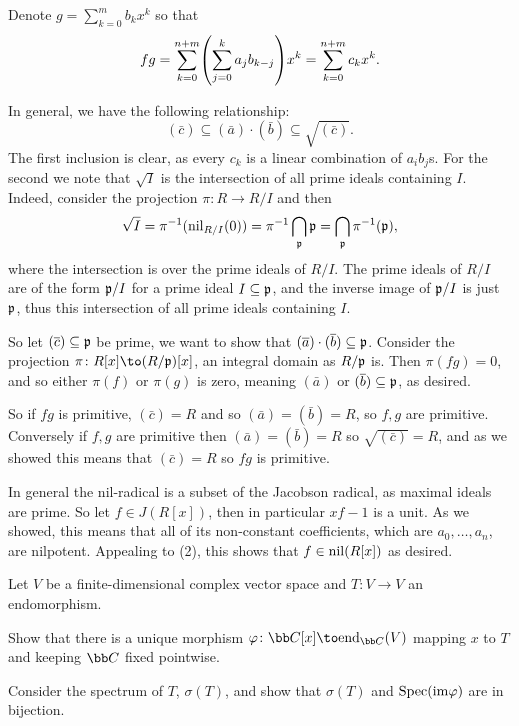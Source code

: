     \item Denote $g=\sum_{k=0}^mb_kx^k$ so that
    $$ fg = \sum_{k=0}^{n+m}\mathopen{}\mathclose{\left(\sum_{j=0}^k a_jb_{k-j}\right)}x^k = \sum_{k=0}^{n+m} c_kx^k . $$

    In general, we have the following relationship:
    $$ (\bar c) \subseteq (\bar a)\cdot(\bar b) \subseteq \sqrt{(\bar c)} . $$
    The first inclusion is clear, as every $c_k$ is a linear combination of $a_ib_j$s.
    For the second we note that $\sqrt I$ is the intersection of all prime ideals containing $I$.
    Indeed, consider the projection $\pi\colon R\to R/I$ and then
    $$ \sqrt I = \pi^{-1}({\rm nil}_{R/I}(0)) = \pi^{-1}\bigcap_{{\frak p}}{{\frak p}} = \bigcap_{{\frak p}}\pi^{-1}({{\frak p}}) , $$
    where the intersection is over the prime ideals of $R/I$.
    The prime ideals of $R/I$ are of the form ${{\frak p}}/I$ for a prime ideal $I\subseteq{{\frak p}}$, and the inverse image of
    ${{\frak p}}/I$ is just ${{\frak p}}$, thus this intersection of all prime ideals containing $I$.

    So let $({\overline{c}})\subseteq{{\frak p}}$ be prime, we want to show that $({\overline{a}})\cdot({\overline{b}})\subseteq{{\frak p}}$.
    Consider the projection $\pi\colon R[x]\to(R/\p)[x]$, an integral domain as $R/{{\frak p}}$ is.
    Then $\pi(fg)=0$, and so either $\pi(f)$ or $\pi(g)$ is zero, meaning $(\bar a)$ or $({\overline{b}})\subseteq{{\frak p}}$, as desired.

    So if $fg$ is primitive, $(\bar c)=R$ and so $(\bar a)=(\bar b)=R$, so $f,g$ are primitive.
    Conversely if $f,g$ are primitive then $(\bar a)=(\bar b)=R$ so $\sqrt{(\bar c)}=R$, and as we showed this means that
    $(\bar c)=R$ so $fg$ is primitive.

    \item In general the nil-radical is a subset of the Jacobson radical, as maximal ideals are prime.
    So let $f\in J(R[x])$, then in particular $xf-1$ is a unit.
    As we showed, this means that all of its non-constant coefficients, which are $a_0,\dots,a_n$, are nilpotent.
    Appealing to (2), this shows that $f\in{\rm nil}(R[x])$ as desired.
\eenum

\bprob

    Let $V$ be a finite-dimensional complex vector space and $T\colon V\to V$ an endomorphism.
    \benum
        \item Show that there is a unique morphism $\phi\colon\bC[x]\to\endo_\bC(V)$ mapping $x$ to $T$ and keeping $\bC$ fixed pointwise.
        \item Consider the spectrum of $T$, $\sigma(T)$, and show that $\sigma(T)$ and ${\rm Spec}({\rm im}\varphi)$ are in bijection.
    \eenum

